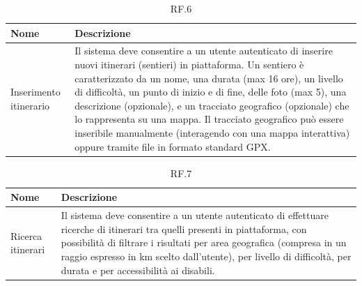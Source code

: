 \documentclass{natourDoc}
\begin{document}
\begin{table}[H]
	\centering
	\begin{tabular}{ |p{5cm}|p{10.3cm}| }
		\hline
		\rowcolor{PineGreen!70}
		\textbf{Nome}          & \textbf{Descrizione}                                                                                                    \\
		\hline
		Inserimento itinerario & Il sistema deve consentire a un utente autenticato di inserire nuovi itinerari (sentieri) in piattaforma. Un sentiero è
		caratterizzato da un nome, una durata (max 16 ore), un livello di difficoltà, un punto di inizio e di fine, delle foto (max 5), una descrizione
		(opzionale), e un tracciato geografico (opzionale) che lo rappresenta su una mappa. Il tracciato
		geografico può essere inseribile manualmente (interagendo con una mappa interattiva) oppure
		tramite file in formato standard GPX.                                                                                                            \\
		\hline
	\end{tabular}
	\caption{RF.6}

\end{table}

\begin{table}[H]
	\centering
	\begin{tabular}{ |p{5cm}|p{10.3cm}| }
		\hline
		\rowcolor{PineGreen!70}
		\textbf{Nome}     & \textbf{Descrizione}                                                                                                                                               \\
		\hline
		Ricerca itinerari & Il sistema deve consentire a un utente autenticato di effettuare ricerche di itinerari tra quelli presenti in piattaforma, con possibilità di filtrare i risultati
		per area geografica (compresa in un raggio espresso in km scelto dall'utente), per livello di difficoltà, per durata e per accessibilità ai disabili.                                  \\
		\hline
	\end{tabular}
	\caption{RF.7}

\end{table}
\end{document}
